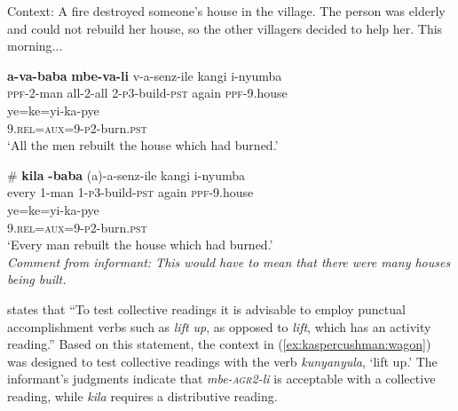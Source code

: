 \documentclass[letterpaper, 12pt]{article}
\begin{document}
\begin{exe}

 \ex Context: A fire destroyed someone's house in the village. The person was elderly and could not rebuild her house, so the other villagers decided to help her. This morning...  \\

\begin{xlist}

\ex \gll \textbf{a-va-baba} \textbf{mbe-va-li} v-a-senz-ile kangi i-nyumba \\
\textsc{ppf}-2-man all-2-all 2-\textsc{p3}-build-\textsc{pst} again \textsc{ppf}-9.house\\

\gll ye=ke=yi-ka-pye  \\ 
 9.\textsc{rel}=\textsc{aux}=9-\textsc{p2}-burn.\textsc{pst} \\
`All the men rebuilt the house which had burned.' \\

\vspace{5mm}

\ex \gll \# \textbf{kila} \textbf{-baba} (a)-a-senz-ile kangi i-nyumba \\
{} every 1-man 1-\textsc{p3}-build-\textsc{pst} again \textsc{ppf}-9.house \\

\gll ye=ke=yi-ka-pye   \\ 
9.\textsc{rel}=\textsc{aux}=9-\textsc{p2}-burn.\textsc{pst}\\
`Every man rebuilt the house which had burned.' \\ 
\textit{Comment from informant: This would have to mean that there were many houses being built.}

\end{xlist}
\end{exe}


\citealt[p. 121]{szabolcsi10} states that ``To test collective readings it is advisable to employ punctual accomplishment verbs such as \textit{lift up}, as opposed to \emph{lift}, which has an activity reading.'' Based on this statement, the context in (\ref{ex:kaspercushman:wagon}) was designed to test collective readings with the verb \textit{kunyanyula}, `lift up.' The informant's judgments indicate that  \textit{mbe-\textsc{agr2}-li} is acceptable with a collective reading, while \textit{kila} requires a distributive reading. 
\end{document}
